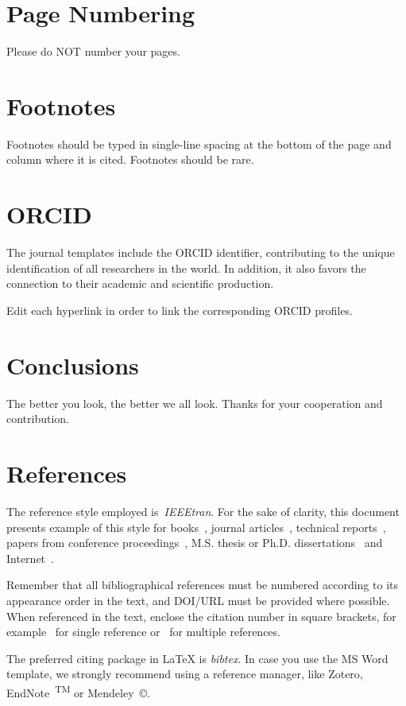 \documentclass{jcst}
\begin{document}
\section{Page Numbering}
Please do NOT number your pages.

\section{Footnotes}
Footnotes should be typed in single-line spacing at the bottom of the page and column where it is cited. Footnotes should be rare.

\section{ORCID}
The journal templates include the ORCID identifier, contributing to the unique identification of all researchers in the world. In addition, it also favors the connection to their academic and scientific production.

Edit each hyperlink in order to link the corresponding ORCID profiles.

\section{Conclusions}
The better you look, the better we all look. Thanks for your cooperation and contribution.

\section{References}
The reference style employed is~\emph{IEEEtran}. For the sake of clarity, this document presents example of this style for books~\cite{book}, journal articles~\cite{article}, technical reports~\cite{unpublished}, papers from conference proceedings~\cite{proceedings}, M.S. thesis or Ph.D. dissertations~\cite{phdthesis} and Internet~\cite{internet}. 

Remember that all bibliographical references must be numbered according to its appearance order in the text, and DOI/URL must be provided where possible. When referenced in the text, enclose the citation number in square brackets, for example~\cite{book} for single reference or~\cite{book,article,proceedings} for multiple references. 

The preferred citing package in LaTeX is \emph{bibtex}. In case you use the MS Word template, we strongly recommend using a reference manager, like Zotero, EndNote~\textsuperscript{TM} or Mendeley~\copyright.
\end{document}
